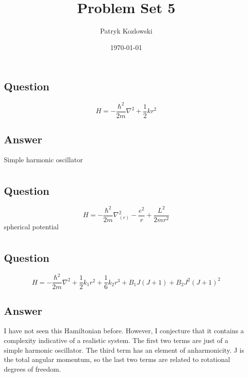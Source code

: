 \documentclass[12pt]{article}
\author{Patryk Kozlowski}
\title{Problem Set 5}
\date{\today}
\begin{document}
\maketitle
\section{}
\subsection{Question}
\begin{equation}
    H=-\frac{\hbar^{2}}{2m} \nabla^{2}+\frac{1}{2} kr^{2}
\end{equation}
\subsection{Answer}
Simple harmonic oscillator
\section{}
\subsection{Question}
\begin{equation}
    H=-\frac{\hbar^{2}}{2m} \nabla^{2}_{(r)}-\frac{e^{2}}{r} +\frac{L^{2}}{2mr^{2}}
\end{equation}
spherical potential
\section{}
\subsection{Question}
\begin{equation}
    H=-\frac{\hbar^{2}}{2m} \nabla^{2} +\frac{1}{2} k_1r^{2} + \frac{1}{6}k_{2} r^{3}+B_{1} J(J+1)+B_{2} J^{2}(J+1)^{2}
\end{equation}
\subsection{Answer}
I have not seen this Hamiltonian before. However, I conjecture that it contains a complexity indicative of a realistic system. The first two terms are just of a simple harmonic oscillator. The third term has an element of anharmonicity. J is the total angular momentum, so the last two terms are related to rotational degrees of freedom.
\section{}
\end{document}
